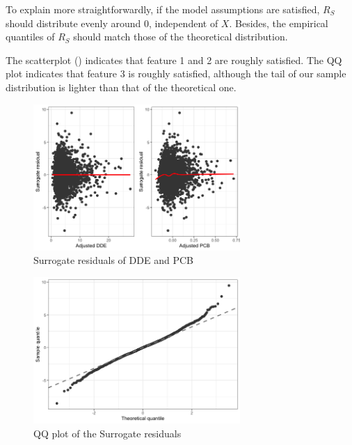 \documentclass[10pt]{jmlr}%
\begin{document}
To explain more straightforwardly, if the model assumptions are satisfied, $R_S$ should distribute evenly around 0, independent of $X$. Besides, the empirical quantiles of $R_S$  should match those of the theoretical distribution.

The scatterplot () indicates that feature 1 and 2 are roughly satisfied. The QQ plot indicates that feature 3 is roughly satisfied, although the tail of our sample distribution is lighter than that of the theoretical one. 


\begin{figure}
	\centering
	\includegraphics[width=0.7\textwidth]{Surrogate_residuals.png}
	\caption{Surrogate residuals of DDE and PCB}
	\label{fig:surrogateresid}
\end{figure}

\begin{figure}
	\centering
	\includegraphics[width=0.7\textwidth]{qqplot.png}
	\caption{QQ plot of the Surrogate residuals}
	\label{fig:qqplot}
\end{figure}
\end{document}
